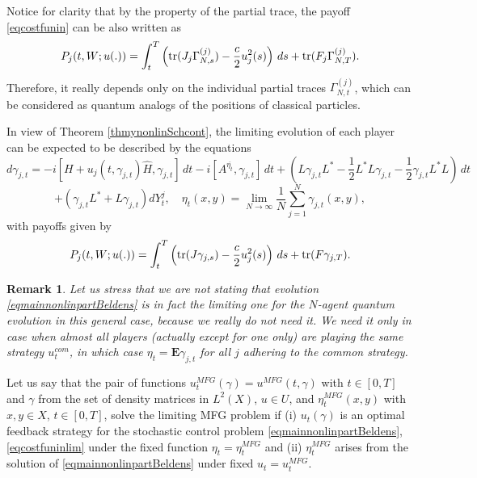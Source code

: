 \documentclass[12pt]{article}
\def\E{\mathbf{E}}
\def\tr{\rm{tr}}
\def\ga{\gamma}
\newtheorem{remark}{Remark}
\newcommand{\Ga}{\Gamma}
\begin{document}
Notice for clarity that by the property of the partial trace, the payoff
\eqref{eqcostfunin} can be also written as
 \begin{equation}
\label{eqcostfunineq}
P_j(t, W ; u(.)) =\int_t^T  \left( {\tr} (J_j \Ga^{(j)}_{N,s}) -\frac{c}{2} u_j^2(s)\right)\, ds
+{\tr} (F_j\Ga^{(j)}_{N,T}).
\end{equation}
Therefore, it really depends only on the individual partial traces $\Ga^{(j)}_{N,t}$,
which can be considered as quantum analogs of the positions of classical particles.

In view of Theorem \ref{thmynonlinSchcont},
the limiting evolution of each player can be expected to be  described by the equations
\[
d\ga_{j,t}=-i[H+u_j(t,\ga_{j,t}) \hat H,\ga_{j,t}] \, dt-i[A^{\overline{\eta_t}}, \ga_{j,t}] \, dt
+(L\ga_{j,t} L^* -\frac12 L^*L \ga_{j,t} -\frac12 \ga_{j,t} L^*L)\, dt
\]
\begin{equation}
\label{eqmainnonlinpartBeldens}
+(\ga_{j,t} L^*+L \ga_{j,t}) dY^j_t, \quad \eta_t(x,y)=\lim_{N\to \infty}\frac{1}{N}\sum_{j=1}^N \ga_{j,t}(x,y),
\end{equation}
with payoffs given by
 \begin{equation}
\label{eqcostfuninlim}
P_j(t, W ; u(.)) =\int_t^T  \left(  {\tr} (J \ga_{j,s}) -\frac{c}{2} u_j^2(s)\right)\, ds +{\tr} (F\ga_{j,T}).
\end{equation}

\begin{remark} Let us stress that we are not stating that evolution \eqref{eqmainnonlinpartBeldens}
is in fact the limiting one for the $N$-agent quantum evolution in this general case,
because we really do not need it. We need it only in case when almost all players (actually except
for one only) are playing the same strategy $u_t^{com}$, in which case $\eta_t=\E \ga_{j,t}$ for all $j$ adhering
to the common strategy.
\end{remark}

Let us say that the pair of functions $u^{MFG}_t(\ga)=u^{MFG}(t,\ga)$ with $t\in [0,T]$
and $\ga$ from the set of density matrices in $L^2(X)$, $u\in U$,
and $\eta^{MFG}_t(x,y)$ with $x,y\in X$, $t\in [0,T]$, solve the limiting MFG problem if
(i) $u_t(\ga)$ is an optimal feedback strategy for the stochastic control problem \eqref{eqmainnonlinpartBeldens},
\eqref{eqcostfuninlim} under the fixed function $\eta_t=\eta_t^{MFG}$ and (ii) $\eta_t^{MFG}$ arises
from the solution of \eqref{eqmainnonlinpartBeldens} under fixed $u_t=u_t^{MFG}$.
\end{document}
